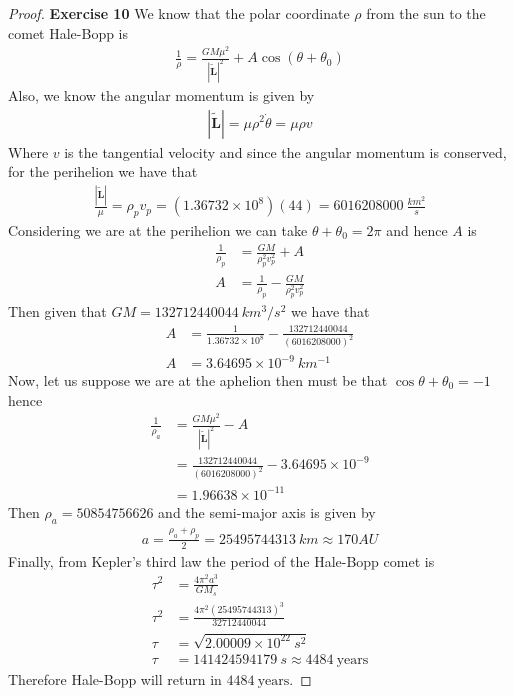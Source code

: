 \documentclass[11pt]{article}
\theoremstyle{definition}
\begin{document}
\cleardoublepage
\begin{proof}{\textbf{Exercise 10}}
We know that the polar coordinate $\rho$ from the sun to the comet Hale-Bopp
is
\begin{align*}
    \frac{1}{\rho} = \frac{GM\mu^2}{|\bm{\tilde{L}}|^2} + A\cos(\theta + \theta_0)
\end{align*}
Also, we know the angular momentum is given by
\begin{align*}
    |\bm{\tilde{L}}| = \mu\rho^2\dot\theta = \mu\rho v
\end{align*}
Where $v$ is the tangential velocity and since the angular momentum is
conserved, for the perihelion we have that
\begin{align*}
    \frac{|\bm{\tilde{L}}|}{\mu} = \rho_p v_p = (1.36732\times 10^8)(44)
    = 6016208000~\frac{km^2}{s}
\end{align*}
Considering we are at the perihelion we can take $\theta + \theta_0 = 2\pi$
and hence $A$ is 
\begin{align*}
    \frac{1}{\rho_p} &= \frac{GM}{\rho_p^2v_p^2} + A\\
    A &= \frac{1}{\rho_p} - \frac{GM}{\rho_p^2v_p^2}
\end{align*}
Then given that $GM = 132712440044~km^3/s^2$ we have that
\begin{align*}
    A &= \frac{1}{1.36732\times 10^8}
    - \frac{132712440044}{(6016208000)^2}\\
    A &= 3.64695\times 10^{-9}~km^{-1}
\end{align*}
Now, let us suppose we are at the aphelion then must be that
$\cos\theta + \theta_0 = -1$ hence
\begin{align*}
    \frac{1}{\rho_a} &= \frac{GM\mu^2}{|\bm{\tilde{L}}|^2} - A\\
    &= \frac{132712440044}{(6016208000)^2}
    - 3.64695\times 10^{-9}\\
    &= 1.96638\times 10^{-11}
\end{align*}
Then $\rho_a = 50854756626$ and the semi-major axis is given by
\begin{align*}
    a = \frac{\rho_a + \rho_p}{2} = 25495744313~km \approx 170 AU
\end{align*}
Finally, from Kepler's third law the period of the Hale-Bopp comet is
\begin{align*}
    \tau^2 &= \frac{4\pi^2 a^3}{GM_s}\\
    \tau^2
    &= \frac{4\pi^2 (25495744313)^3}{32712440044}\\
    \tau &= \sqrt{2.00009 \times 10^{22}~s^2}\\
    \tau &= 141424594179~s \approx 4484~\text{years}
\end{align*}
Therefore Hale-Bopp will return in $4484~\text{years}$.
\end{proof}
\end{document}
